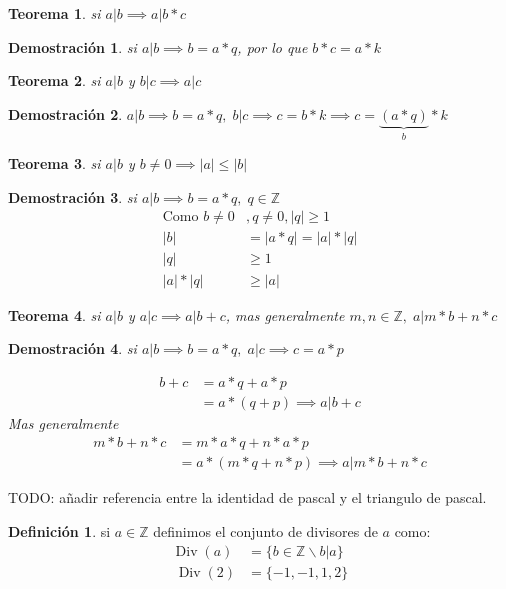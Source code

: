 \documentclass[9pt,a4paper,draft]{article}
\theoremstyle{definition}
\newtheorem{defi}{Definición}
\theoremstyle{plain}
\newtheorem{teo}{Teorema}
\newtheorem{demo}{Demostración}[teo]
\DeclareMathOperator{\Div}{Div}
\begin{document}
\begin{teo} si $a|b\implies a|b*c$ \end{teo}
\begin{demo}si $a|b\implies b=a*q$, por lo que $b*c=a*k$\end{demo}

\begin{teo} si $a|b$ y $b|c\implies a|c$\end{teo}
\begin{demo}$a|b\implies b=a*q,\; b|c\implies c=b*k\implies c=\underbrace{(a*q)}_{b}*k$\end{demo}

\begin{teo} \label{diva0} si $a|b$ y $b\neq{0}\implies|a|\leq|b|$\end{teo}
\begin{demo}
si $a|b\implies b=a*q,\;q\in{\mathbb{Z}}$
\begin{align*}
\text{Como } b\neq{0}&, q\neq{0}, |q|\geq{1}\\
|b|&=|a*q|=|a|*|q|\\
|q|&\geq{1}\\
|a|*|q|&\geq|a|
\end{align*}
\end{demo}

\begin{teo}\label{divDsuma} si $a|b$ y $a|c\implies{a|b+c}$, mas generalmente $m,n\in{\mathbb{Z}},\;a|m*b+n*c$ \end{teo}
\begin{demo}
si $a|b\implies b=a*q,\;a|c\implies c=a*p$

\begin{align*}
b+c&=a*q+a*p\\
 &=a*(q+p) \implies a|b+c
\end{align*}
Mas generalmente
\begin{align*}
m*b+n*c &= m*a*q+n*a*p\\
 &= a*(m*q+n*p) \implies a|m*b+n*c
\end{align*}
\end{demo}

TODO: añadir referencia entre la identidad de pascal y el triangulo de pascal.

\begin{defi} si $a\in{\mathbb{Z}}$ definimos el conjunto de divisores de $a$ como:
\begin{align*}
\Div(a) &= \{b\in{\mathbb{Z}} \backslash b|a\}\\\
\Div(2) &= \{-1,-1,1,2\}
\end{align*}
\end{defi}
\end{document}
